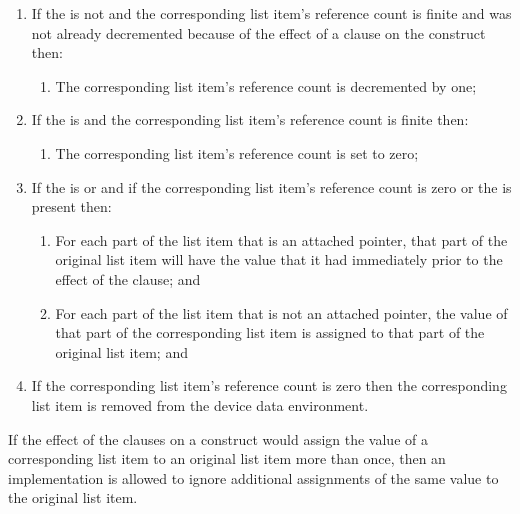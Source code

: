 \begin{enumerate}
\item If the  is not  and the corresponding list 
      item's reference count is finite and was not already decremented because 
      of the effect of a  clause on the construct then:

\begin{enumerate}
\item The corresponding list item's reference count is decremented by one;
\end{enumerate}

\item If the  is  and the corresponding list item's 
      reference count is finite then:

\begin{enumerate}
\item The corresponding list item's reference count is set to zero;
\end{enumerate}

\item If the  is  or  and if the 
      corresponding list item's reference count is zero or the  
       is present then:

\begin{enumerate}
\item For each part of the list item that is an attached pointer, that part 
      of the original list item will have the value that it had immediately
      prior to the effect of the  clause; and
\item For each part of the list item that is not an attached pointer, the value 
      of that part of the corresponding list item is assigned to that part of 
      the original list item; and
\end{enumerate}

\item If the corresponding list item's reference count is zero then the 
      corresponding list item is removed from the device data environment.
\end{enumerate}

\begin{note}
If the effect of the  clauses on a construct would assign the
value of a corresponding list item to an original list item more than once,
then an implementation is allowed to ignore additional assignments of
the same value to the original list item.
\end{note}

